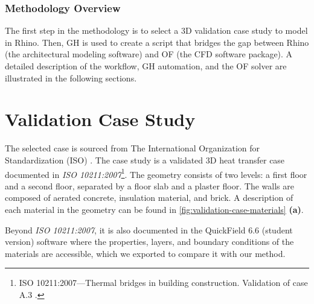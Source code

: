 \subsubsection{Methodology Overview}
The first step in the methodology is to select a 3D validation case study to model in Rhino. 
Then, \gls{GH}  is used to create a script that bridges the gap between Rhino (the architectural modeling software) and  \gls{OF} (the CFD software package). A detailed description of the workflow, \gls{GH} automation, and the \gls{OF} solver are illustrated in the following sections.





\section{Validation Case Study}
The selected case is sourced from The International Organization for Standardization (ISO) \cite{ISO}. The case study is a validated 3D heat transfer case documented in \textit{ISO 10211:2007}\footnote{ISO 10211:2007---Thermal bridges in building construction. Validation of case A.3 \cite{ISO}.}. 
The geometry consists of two levels: a first floor and a second floor, separated by a floor slab and a plaster floor. The walls are composed of aerated concrete, insulation material, and brick.
A description of each material in the geometry can be found in \ref{fig:validation-case-materials} \textbf{(a)}.

Beyond \textit{ISO 10211:2007}, it is also documented in the QuickField 6.6 (student version) software where the properties, layers, and boundary conditions of the materials are accessible, which we exported to compare it with our method. 

   


